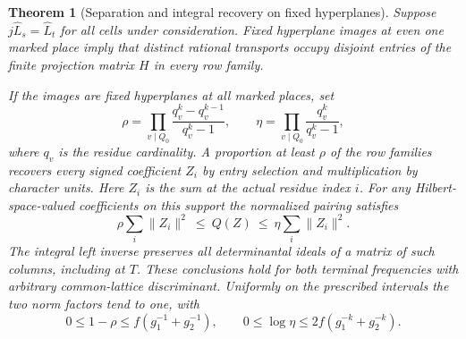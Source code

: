 \documentclass[a4paper,11pt]{article}
\newtheorem{theorem}[proposition]{Theorem}
\theoremstyle{definition}
\theoremstyle{remark}
\numberwithin{equation}{section}
\begin{document}
\begin{theorem}[Separation and integral recovery on fixed hyperplanes]
\leavevmode\label{thm:hyperplanerecovery537}
Suppose \(j\widehat L_s=\widehat L_t\) for all cells under
consideration. Fixed hyperplane images at even one marked place
imply that distinct rational transports occupy disjoint entries
of the finite projection matrix \(H\) in every row family.

If the images are fixed hyperplanes at all marked places, set
\[
     \rho=\prod_{v\mid Q_0}\frac{q_v^k-q_v^{k-1}}{q_v^k-1},
     \qquad
     \eta=\prod_{v\mid Q_0}\frac{q_v^k}{q_v^k-1},
\]
where \(q_v\) is the residue cardinality. A proportion at least
\(\rho\) of the row families recovers every signed coefficient
\(Z_i\) by entry selection and multiplication by character units.
Here \(Z_i\) is the sum at the actual residue index \(i\). For
any Hilbert-space-valued coefficients on this support the
normalized pairing satisfies
\[
           \rho\sum_i\|Z_i\|^2
             \ \le\ Q(Z)\ \le\ \eta\sum_i\|Z_i\|^2 .
\]
The integral left inverse preserves all determinantal ideals
of a matrix of such columns, including at \(T\). These conclusions
hold for both terminal frequencies with arbitrary common-lattice
discriminant. Uniformly on the prescribed intervals the two
norm factors tend to one, with
\[
 0\le 1-\rho\le f(g_1^{-1}+g_2^{-1}),\qquad
 0\le \log\eta\le 2f(g_1^{-k}+g_2^{-k}).
\]
\end{theorem}
\end{document}
